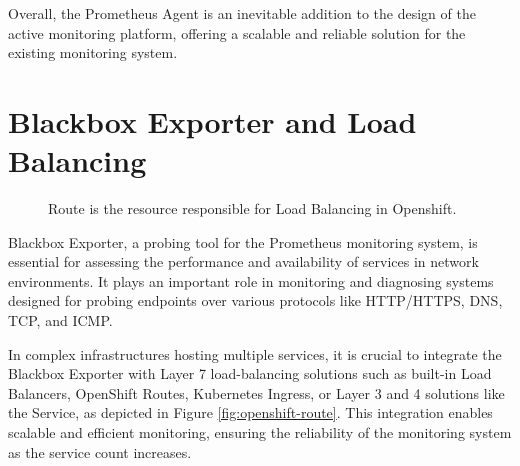 Overall, the Prometheus Agent is an inevitable addition to the design of the active monitoring platform, offering a scalable and reliable solution for the existing monitoring system.

\section{Blackbox Exporter and Load Balancing}

\begin{figure}[htpb]
  \centering
  \caption[Openshift Route]{Route is the resource responsible for Load Balancing in Openshift.}\label{fig:openshift-route}
\end{figure}

Blackbox Exporter, a probing tool for the Prometheus monitoring system, is essential for assessing the performance and availability of services in network environments. It plays an important role in monitoring and diagnosing systems designed for probing endpoints over various protocols like \ac{HTTP}/\ac{HTTPS}, \ac{DNS}, \ac{TCP}, and \ac{ICMP}. 

In complex infrastructures hosting multiple services, it is crucial to integrate the Blackbox Exporter with Layer 7 load-balancing solutions such as built-in Load Balancers, OpenShift Routes, Kubernetes Ingress, or Layer 3 and 4 solutions like the Service, as depicted in Figure \autoref{fig:openshift-route}. This integration enables scalable and efficient monitoring, ensuring the reliability of the monitoring system as the service count increases. 

